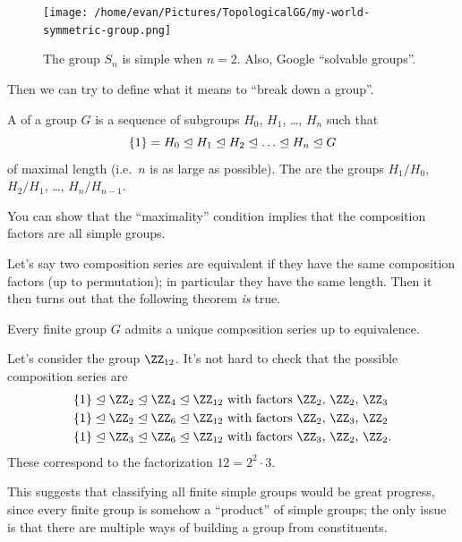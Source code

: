 \begin{figure}[ht]
	\centering
	\texttt{[image: /home/evan/Pictures/TopologicalGG/my-world-symmetric-group.png]}
	\caption{The group $S_n$ is simple when $n=2$. Also, Google ``solvable groups''.}
\end{figure}


Then we can try to define what it means to ``break down a group''.
\begin{definition}
	A  of a group $G$ is a sequence of subgroups
	$H_0$, $H_1$, \dots, $H_n$ such that
	\[ \{1\} = H_0 \normalin H_1 \normalin H_2 \normalin \dots \normalin H_n
		\normalin G \]
	of maximal length (i.e.\ $n$ is as large as possible).
	The  are the groups
	$H_1/H_0$, $H_2/H_1$, \dots, $H_n/H_{n-1}$.
\end{definition}
You can show that the ``maximality'' condition implies that the composition factors are all simple groups.

Let's say two composition series are equivalent if they have the same composition factors (up to permutation); in particular they have the same length.
Then it then turns out that the following theorem \emph{is} true.
\begin{theorem}
	Every finite group $G$ admits a unique composition series up to equivalence.
\end{theorem}

\begin{example}
	[Fundamental Theorem of Arithmetic when $n=12$]
	Let's consider the group $\Zc{12}$.
	It's not hard to check that the possible composition series are
	\begin{align*}
		\{1\} \normalin \Zc2 \normalin \Zc4 \normalin \Zc{12}
		& \text{ with factors $\Zc2$, $\Zc2$, $\Zc3$} \\
		\{1\} \normalin \Zc2 \normalin \Zc6 \normalin \Zc{12}
		& \text{ with factors $\Zc2$, $\Zc3$, $\Zc2$} \\
		\{1\} \normalin \Zc3 \normalin \Zc6 \normalin \Zc{12}
		& \text{ with factors $\Zc3$, $\Zc2$, $\Zc2$}.
	\end{align*}
	These correspond to the factorization $12 = 2^2 \cdot 3$.
\end{example}

This suggests that classifying all finite simple groups would be great progress, since every finite group is somehow a ``product'' of simple groups;
the only issue is that there are multiple ways of building a group from constituents.

